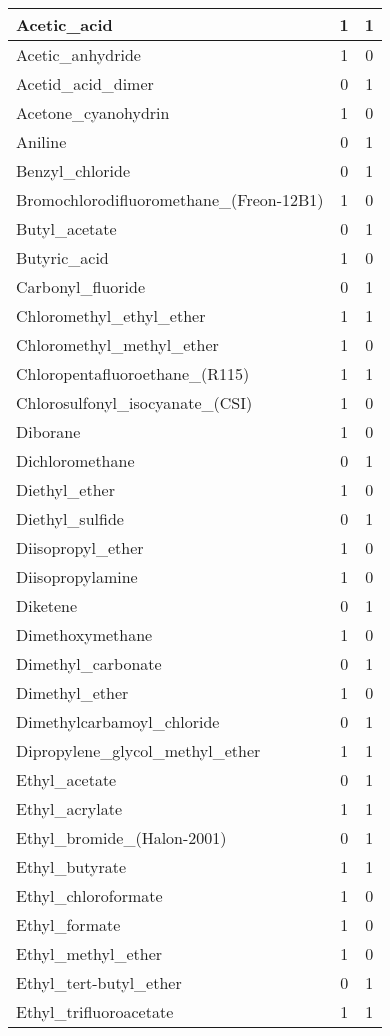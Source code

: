 \begin{longtable}{|l|c|c|}
Acetic\_acid &1 &1\\ \hline
Acetic\_anhydride &1 &0\\ \hline
Acetid\_acid\_dimer &0 &1\\ \hline
Acetone\_cyanohydrin &1 &0\\ \hline
Aniline &0 &1\\ \hline
Benzyl\_chloride &0 &1\\ \hline
Bromochlorodifluoromethane\_(Freon-12B1) &1 &0\\ \hline
Butyl\_acetate &0 &1\\ \hline
Butyric\_acid &1 &0\\ \hline
Carbonyl\_fluoride &0 &1\\ \hline
Chloromethyl\_ethyl\_ether &1 &1\\ \hline
Chloromethyl\_methyl\_ether &1 &0\\ \hline
Chloropentafluoroethane\_(R115) &1 &1\\ \hline
Chlorosulfonyl\_isocyanate\_(CSI) &1 &0\\ \hline
Diborane &1 &0\\ \hline
Dichloromethane &0 &1\\ \hline
Diethyl\_ether &1 &0\\ \hline
Diethyl\_sulfide &0 &1\\ \hline
Diisopropyl\_ether &1 &0\\ \hline
Diisopropylamine &1 &0\\ \hline
Diketene &0 &1\\ \hline
Dimethoxymethane &1 &0\\ \hline
Dimethyl\_carbonate &0 &1\\ \hline
Dimethyl\_ether &1 &0\\ \hline
Dimethylcarbamoyl\_chloride &0 &1\\ \hline
Dipropylene\_glycol\_methyl\_ether &1 &1\\ \hline
Ethyl\_acetate &0 &1\\ \hline
Ethyl\_acrylate &1 &1\\ \hline
Ethyl\_bromide\_(Halon-2001) &0 &1\\ \hline
Ethyl\_butyrate &1 &1\\ \hline
Ethyl\_chloroformate &1 &0\\ \hline
Ethyl\_formate &1 &0\\ \hline
Ethyl\_methyl\_ether &1 &0\\ \hline
Ethyl\_tert-butyl\_ether &0 &1\\ \hline
Ethyl\_trifluoroacetate &1 &1\\ \hline

\end{longtable}
